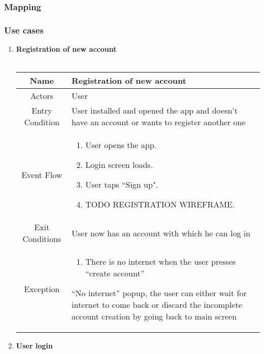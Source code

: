 \subsubsection{Mapping}


\subsubsection{Use cases}

\begin{enumerate}
	
\item \textbf{Registration of new account}\\\\

\begin{table}[H]
{
\begin{tabular}{|c|p{14cm}|}
	\hline
	Name & Registration of new account\\
	\hline
	Actors & User\\
	\hline
	Entry Condition & User installed and opened the app and doesn’t have an account or wants to register another one\\
	\hline
	Event Flow & \begin{enumerate}
		\item User opens the app.
		\item Login screen loads.
		\item User taps “Sign up".
		\item TODO REGISTRATION WIREFRAME.
		\end{enumerate}\\
	\hline
	Exit Conditions & User now has an account with which he can log in\\
	\hline
	Exception & \begin{enumerate}
		\item There is no internet when the user presses “create account”
	\end{enumerate}
	
	“No internet” popup, the user can either wait for internet to come back or discard the incomplete account creation by going back to main screen\\
	\hline
\end{tabular}
}
\end{table}	

\item \textbf{User login}\\\\
	

\end{enumerate}
